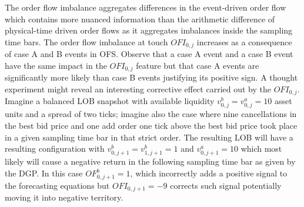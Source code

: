 \documentclass[10pt,a4paper,oneside]{article}
\begin{document}
The order flow imbalance aggregates differences in the event-driven order flow which contains more nuanced information than the arithmetic difference of physical-time driven order flows as it aggregates imbalances inside the sampling time bars. The order flow imbalance at touch $OFI_{0,j}$ increases as a consequence of case A and B events in OFS. Observe that a case A event and a case B event have the same impact in the $OFI_{0,j}$ feature but that case A events are significantly more likely than case B events justifying its positive sign. A thought experiment might reveal an interesting corrective effect carried out by the $OFI_{0,j}$. Imagine a balanced LOB snapshot with available liquidity $v^{b}_{0, j} = v^a_{0,j} = 10$  asset units and a spread of two ticks; imagine also the case where nine cancellations in the best bid price and one add order one tick above the best bid price took place in a given sampling time bar in that strict order. The resulting LOB will have a resulting configuration with $v^{b}_{0,j + 1} = v^{b}_{1,j + 1} = 1$ and $v^{a}_{0,j + 1} = 10$ which most likely will cause a negative return in the following sampling time bar as given by the DGP. In this case $OF^{b}_{0, j+1} = 1$, which incorrectly adds a positive signal to the forecasting equations but $OFI_{0, j + 1} = -9$ corrects such signal potentially moving it into negative territory.
\end{document}
